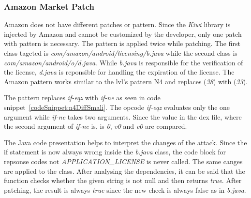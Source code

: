 \subsubsection{Amazon Market Patch}
Amazon does not have different patches or pattern.
Since the \textit{Kiwi} library is injected by Amazon and cannot be customized by the developer, only one patch with pattern is necessary.
The pattern is applied twice while patching.
The first class tageted is \textit{com/amazon/android/licensing/b.java} while the second class is \textit{com/amazon/android/o/d.java}.
While \textit{b.java} is responsible for the verification of the license, \textit{d.java} is reponsible for handling the expiration of the license.
\newline
The Amazon pattern works similar to the \gls{lvl}'s pattern N4 and replaces (\textit{38}) with (\textit{33}).
\newline

The pattern replaces \textit{if-eqz} with \textit{if-ne} as seen in code snippet~\ref{codeSnippet:n4DiffSmali}.
The opcode \textit{if-eqz} evaluates only the one argument while \textit{if-ne} takes two arguments.
Since the value in the \gls{dex} file, where the second argument of \textit{if-ne} is, is \textit{0}, \textit{v0} and \textit{v0} are compared.

The Java code presentation helps to interpret the changes of the attack.
Since the if statement is now always wrong inside the \textit{b.java} class, the code block for repsonse codes not \textit{APPLICATION\_LICENSE} is never called.
The same canges are applied to the  class.
After analysing the dependencies, it can be said that the function checks whether the given string is not null and then returns \textit{true}.
After patching, the result is always \textit{true} since the new check is always false as in \textit{b.java}.
\newline


